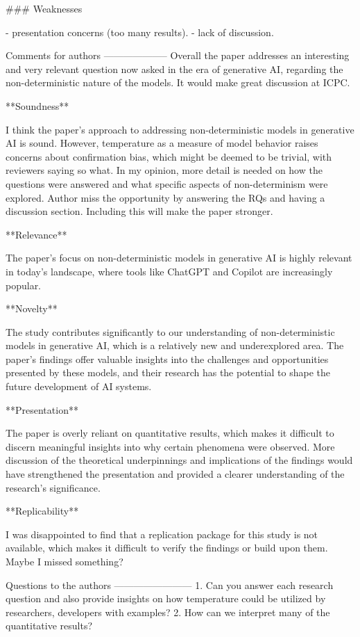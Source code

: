 ### Weaknesses

- presentation concerns (too many results).
- lack of discussion.

Comments for authors
--------------------
Overall the paper addresses an interesting and very relevant question now asked in the era of generative AI, regarding the non-deterministic nature of the models. It would make great discussion at ICPC. %


**Soundness**

I think the paper's approach to addressing non-deterministic models in generative AI is sound. However, temperature as a measure of model behavior raises concerns about confirmation bias, which might be deemed to be trivial, with reviewers saying so what.  In my opinion, more detail is needed on how the questions were answered and what specific aspects of non-determinism were explored. Author miss the opportunity by answering the RQs and having a discussion section. Including this will make the paper stronger. %

**Relevance**

The paper's focus on non-deterministic models in generative AI is highly relevant in today's landscape, where tools like ChatGPT and Copilot are increasingly popular. %

**Novelty** 

The study contributes significantly to our understanding of non-deterministic models in generative AI, which is a relatively new and underexplored area. The paper's findings offer valuable insights into the challenges and opportunities presented by these models, and their research has the potential to shape the future development of AI systems. %

**Presentation**

The paper is overly reliant on quantitative results, which makes it difficult to discern meaningful insights into why certain phenomena were observed. More discussion of the theoretical underpinnings and implications of the findings would have strengthened the presentation and provided a clearer understanding of the research's significance. %

**Replicability**

I was disappointed to find that a replication package for this study is not available, which makes it difficult to verify the findings or build upon them.  Maybe I missed something? %

Questions to the authors
------------------------
1. Can you answer each research question and also provide insights on how temperature could be utilized by researchers, developers with examples?
2. How can we interpret many of the quantitative results?


